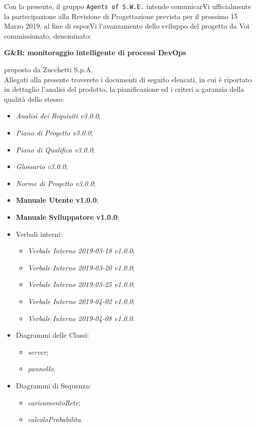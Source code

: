 \documentclass[11pt, a4paper]{letter} %
\begin{document}
\begin{letter}
		Con la presente, il gruppo \texttt{Agents of S.W.E.} intende comunicarVi ufficialmente la partecipazione alla Revisione di Progettazione prevista per il prossimo 15 Marzo 2019, al fine di esporVi l'avanzamento dello sviluppo del progetto da Voi commissionato, denominato:
		\begin{center}
			\textbf{G\&B: monitoraggio intelligente di processi DevOps}
		\end{center}
		proposto da Zucchetti S.p.A.\\
		Allegati alla presente troverete i documenti di seguito elencati, in cui è riportato in dettaglio l'analisi del prodotto, la pianificazione ed i criteri a garanzia della qualità dello stesso:
		\begin{itemize}
			\item \textit{Analisi dei Requisiti v3.0.0};
			\item  \textit{Piano di Progetto v3.0.0};
			\item \textit{Piano di Qualifica v3.0.0};
			\item \textit{Glossario v3.0.0};
			\item \textit{Norme di Progetto v3.0.0};	
			\item \textbf{Manuale Utente v1.0.0};
			\item \textbf{Manuale Sviluppatore v1.0.0};
			\item Verbali interni: 
			\begin{itemize}
				\item \textit{Verbale Interno 2019-03-18 v1.0.0};
				\item \textit{Verbale Interno 2019-03-20 v1.0.0};
				\item \textit{Verbale Interno 2019-03-25 v1.0.0};
				\item \textit{Verbale Interno 2019-04-02 v1.0.0};
				\item \textit{Verbale Interno 2019-04-08 v1.0.0}.
			\end{itemize}
		\item Diagrammi delle Classi: 
			\begin{itemize}
				\item \textit{server};
				\item \textit{pannello}.
			\end{itemize}
		\item Diagrammi di Sequenza: 
			\begin{itemize}
				\item \textit{caricamentoRete};
				\item \textit{calcoloProbabilita}.

\end{itemize}
\end{itemize}
\end{letter}
\end{document}
